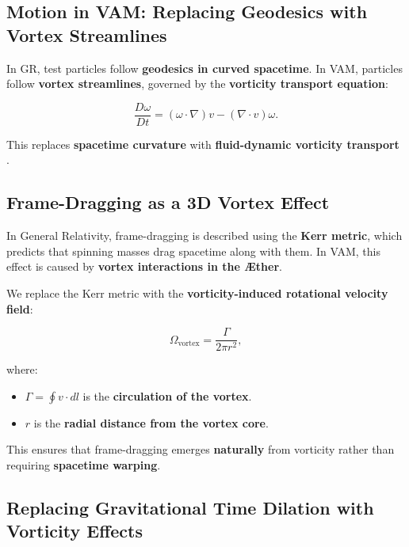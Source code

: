 \documentclass[preprint]{revtex4-2}
\begin{document}
    \subsection{Motion in VAM: Replacing Geodesics with Vortex Streamlines}

    In GR, test particles follow \textbf{geodesics in curved spacetime}. In VAM, particles follow \textbf{vortex streamlines}, governed by the \textbf{vorticity transport equation}:

    \begin{equation*}
        \frac{D\omega}{Dt} = (\omega \cdot \nabla) v - (\nabla \cdot v) \omega.
    \end{equation*}

    This replaces \textbf{spacetime curvature} with \textbf{fluid-dynamic vorticity transport} \cite{lamb_hydrodynamics, feynman_superfluid}.



    \subsection*{Frame-Dragging as a 3D Vortex Effect}

    In General Relativity, frame-dragging is described using the \textbf{Kerr metric}, which predicts that spinning masses drag spacetime along with them. In VAM, this effect is caused by \textbf{vortex interactions in the Æther}.

    We replace the Kerr metric with the \textbf{vorticity-induced rotational velocity field}:

    \begin{equation*}
        \Omega_\text{vortex} = \frac{\Gamma}{2\pi r^2},
    \end{equation*}

    where:
    \begin{itemize}
        \item \( \Gamma = \oint v \cdot dl \) is the \textbf{circulation of the vortex}.
        \item \( r \) is the \textbf{radial distance from the vortex core}.
    \end{itemize}

    This ensures that frame-dragging emerges \textbf{naturally} from vorticity rather than requiring \textbf{spacetime warping}.



    \subsection{Replacing Gravitational Time Dilation with Vorticity Effects}
\end{document}
